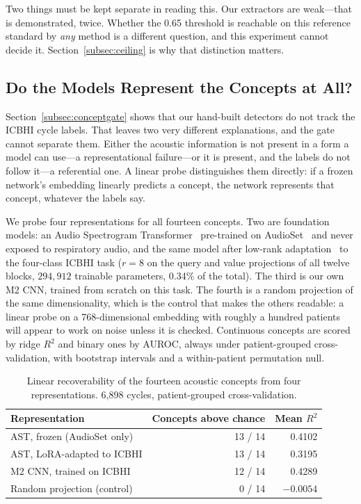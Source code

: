 \documentclass[journal,onecolumn]{IEEEtran}
\begin{document}
Two things must be kept separate in reading this. Our extractors are weak---that is
demonstrated, twice. Whether the 0.65 threshold is reachable on this reference
standard by \emph{any} method is a different question, and this experiment cannot
decide it. Section~\ref{subsec:ceiling} is why that distinction matters.

\subsection{Do the Models Represent the Concepts at All?}
\label{subsec:probe}

Section~\ref{subsec:conceptgate} shows that our hand-built detectors do not track the
ICBHI cycle labels. That leaves two very different explanations, and the gate cannot
separate them. Either the acoustic information is not present in a form a model can
use---a representational failure---or it is present, and the labels do not follow it---a
referential one. A linear probe distinguishes them directly: if a frozen network's
embedding linearly predicts a concept, the network represents that concept, whatever
the labels say.

We probe four representations for all fourteen concepts. Two are foundation models: an
Audio Spectrogram Transformer~\cite{gong2021ast} pre-trained on
AudioSet~\cite{gemmeke2017audioset} and never exposed to respiratory audio, and the
same model after low-rank adaptation~\cite{hu2022lora} to the four-class ICBHI task
($r=8$ on the query and value projections of all twelve blocks, $294{,}912$ trainable
parameters, 0.34\% of the total). The third is our own M2 CNN, trained from scratch on
this task. The fourth is a random projection of the same dimensionality, which is the
control that makes the others readable: a linear probe on a 768-dimensional embedding
with roughly a hundred patients will appear to work on noise unless it is checked.
Continuous concepts are scored by ridge $R^2$ and binary ones by AUROC, always under
patient-grouped cross-validation, with bootstrap intervals and a within-patient
permutation null.

\begin{table}[!t]
\centering
\caption{Linear recoverability of the fourteen acoustic concepts from four
representations. 6{,}898 cycles, patient-grouped cross-validation.}
\label{tab:probe}
\begin{tabular}{lrr}
\toprule
Representation & Concepts above chance & Mean $R^2$ \\
\midrule
AST, frozen (AudioSet only)      & 13 / 14 & 0.4102 \\
AST, LoRA-adapted to ICBHI       & 13 / 14 & 0.3195 \\
M2 CNN, trained on ICBHI         & 12 / 14 & 0.4289 \\
Random projection (control)      & \phantom{0}0 / 14 & $-0.0054$ \\
\bottomrule
\end{tabular}
\end{table}
\end{document}
